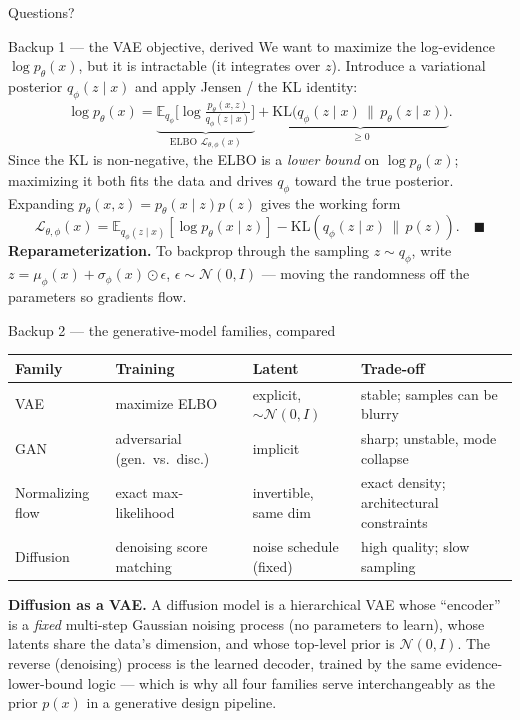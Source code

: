 \documentclass[10pt, aspectratio=169]{beamer}
\begin{document}
\begin{frame}[standout]
Questions?
\end{frame}

\appendix

\begin{frame}{Backup 1 --- the VAE objective, derived}
\footnotesize
We want to maximize the log-evidence $\log p_\theta(x)$, but it is intractable (it integrates over $z$). Introduce a variational posterior $q_\phi(z\mid x)$ and apply Jensen / the KL identity:
\[
\log p_\theta(x) = \underbrace{\mathbb{E}_{q_\phi}\Big[\log\tfrac{p_\theta(x,z)}{q_\phi(z\mid x)}\Big]}_{\text{ELBO } \mathcal{L}_{\theta,\phi}(x)} + \underbrace{\mathrm{KL}\big(q_\phi(z\mid x)\,\|\,p_\theta(z\mid x)\big)}_{\ge 0}.
\]
Since the KL is non-negative, the ELBO is a \emph{lower bound} on $\log p_\theta(x)$; maximizing it both fits the data and drives $q_\phi$ toward the true posterior. Expanding $p_\theta(x,z)=p_\theta(x\mid z)p(z)$ gives the working form
\[
\mathcal{L}_{\theta,\phi}(x) = \mathbb{E}_{q_\phi(z\mid x)}[\log p_\theta(x\mid z)] - \mathrm{KL}(q_\phi(z\mid x)\,\|\,p(z)). \quad\blacksquare
\]
\textbf{Reparameterization.} To backprop through the sampling $z\sim q_\phi$, write $z = \mu_\phi(x) + \sigma_\phi(x)\odot\epsilon$, $\epsilon\sim\mathcal{N}(0,I)$ --- moving the randomness off the parameters so gradients flow.
\end{frame}

\begin{frame}{Backup 2 --- the generative-model families, compared}
\footnotesize
\begin{center}\scriptsize\renewcommand{\arraystretch}{1.4}
\begin{tabular}{l|l|l|l}
\textbf{Family} & \textbf{Training} & \textbf{Latent} & \textbf{Trade-off} \\
\hline
VAE & maximize ELBO & explicit, $\sim\mathcal{N}(0,I)$ & stable; samples can be blurry \\
GAN & adversarial (gen.\ vs.\ disc.) & implicit & sharp; unstable, mode collapse \\
Normalizing flow & exact max-likelihood & invertible, same dim & exact density; architectural constraints \\
Diffusion & denoising score matching & noise schedule (fixed) & high quality; slow sampling \\
\end{tabular}
\end{center}
\medskip
\textbf{Diffusion as a VAE.} A diffusion model is a hierarchical VAE whose ``encoder'' is a \emph{fixed} multi-step Gaussian noising process (no parameters to learn), whose latents share the data's dimension, and whose top-level prior is $\mathcal{N}(0,I)$. The reverse (denoising) process is the learned decoder, trained by the same evidence-lower-bound logic --- which is why all four families serve interchangeably as the prior $p(x)$ in a generative design pipeline.
\end{frame}
\end{document}
